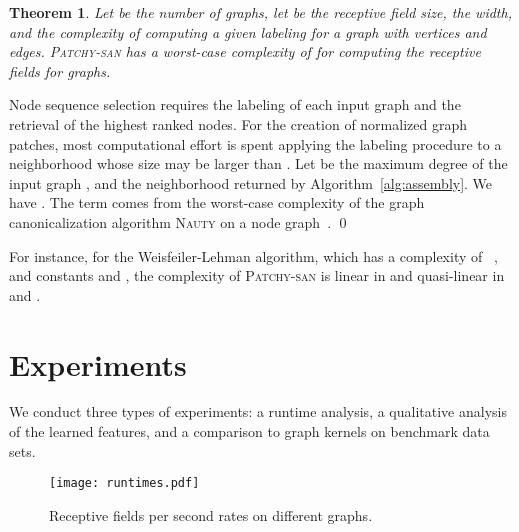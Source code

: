 \documentclass{article}
\newtheorem{thmx}{Theorem}
\renewenvironment{proof}{{\bf Proof:}}{\qed}
\newcommand{\nauty}{{\textsc{Nauty}}\xspace}
\begin{document}
\begin{thmx}
Let  be the number of graphs, let  be the receptive field size,  the width, and  the complexity of computing a given labeling  for a graph with  vertices and  edges. \textsc{Patchy-san} has a worst-case complexity of  for computing the receptive fields for  graphs.
\end{thmx}
\begin{proof}
Node sequence selection requires the labeling of each input graph and the retrieval of the  highest ranked nodes. For the creation of normalized graph patches, most computational effort is spent applying the labeling procedure  to a neighborhood whose size may be larger than . Let  be the maximum degree of the input graph , and  the neighborhood returned by Algorithm~\ref{alg:assembly}. We have .
The term  comes from the worst-case complexity of the graph canonicalization algorithm \nauty on a  node graph~\cite{miyazaki:1997}. 
\end{proof} 

For instance, for the Weisfeiler-Lehman algorithm, which has a complexity of  ~\cite{Berkholz:2013}, and constants  and , the complexity of \textsc{Patchy-san} is linear in  and quasi-linear in  and . 







\section{Experiments}
We conduct three types of experiments: a runtime analysis, a qualitative analysis of the learned features, and a comparison to graph kernels on benchmark data sets. 

\begin{figure}
\texttt{[image: runtimes.pdf]}
\caption{\label{fig-runtime} Receptive fields per second rates on different graphs.}
\end{figure}
\end{document}
